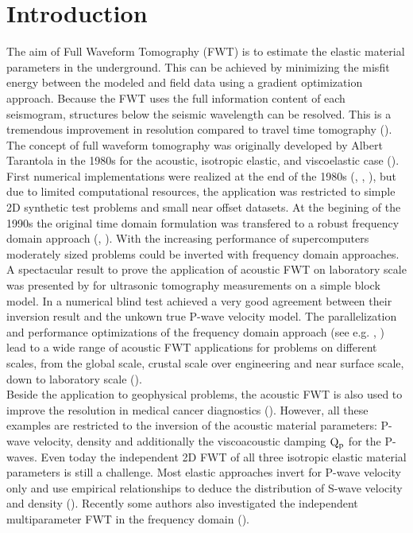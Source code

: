 
\chapter{Introduction}


The aim of Full Waveform Tomography (FWT) is to estimate the elastic material parameters in the underground. This can be achieved by minimizing the misfit energy 
between the modeled and field data using a gradient optimization approach. Because the FWT uses the full information content of each seismogram, structures below the seismic 
wavelength can be resolved. This is a tremendous improvement in resolution compared to travel time tomography (\cite{prattgao:2002}).\\ 
The concept of full waveform tomography was originally developed by Albert Tarantola in the  1980s  for the acoustic, isotropic elastic, and 
viscoelastic case (\cite{tarantola:84a,tarantola:84,tarantola:86,tarantola:88}). First numerical implementations were realized at the end of the 1980s 
(\cite{gauthier:86}, \cite{mora:87}, \cite{pica:90}), but due to limited computational resources, the application was restricted to simple 
2D synthetic test problems and small near offset datasets. At the begining of the 1990s the original time domain formulation was transfered 
to a robust frequency domain approach (\cite{prattworth:90}, \cite{pratt:90}). With the increasing performance of supercomputers moderately 
sized problems could be inverted with frequency domain approaches.\\ A spectacular result to prove the application of acoustic FWT on laboratory scale was presented by \cite{pratt:99} for ultrasonic tomography measurements on a simple block model. In a numerical blind test \cite{brenders:2007} achieved a very good agreement between their inversion result and the unkown true P-wave velocity model. The parallelization and performance optimizations of the frequency domain approach (see e.g. \cite{sourbier:09}, \cite{sourbier:09b}) lead to a wide range of acoustic FWT applications for problems on different scales, from the global scale, crustal scale over engineering and near surface scale, down to laboratory scale (\cite{pratt:2004}).\\ Beside the application to geophysical problems, the acoustic FWT is also used to improve the resolution in medical cancer diagnostics (\cite{pratt:2007}). However, all these examples are restricted to the inversion of the acoustic material parameters: P-wave velocity, density and additionally the viscoacoustic damping $\rm{Q_p}$ for the P-waves. Even today the independent 2D FWT of all three isotropic elastic material parameters is still a challenge. Most elastic approaches invert for P-wave velocity only and use empirical relationships to deduce the distribution of S-wave velocity and density (\cite{shipp:02,sheen:06}). Recently some authors also investigated the independent multiparameter FWT in the frequency domain (\cite{choi:2008,choi:2008a,brossier:2009}).  

